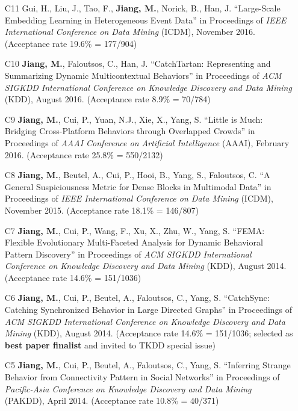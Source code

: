 \documentclass[10pt]{article}
\newenvironment{myindentpar}[1]%
{\begin{list}{}%
         {\setlength{\leftmargin}{#1}}%
         \item[]%
}
{\end{list}}
\newcounter{list}
\begin{document}
\begin{myindentpar}{0.00cm}
\begin{enumerate}[leftmargin=.5cm]
\item[C11] Gui, H., Liu, J., Tao, F., \textbf{Jiang, M.}, Norick, B., Han, J. ``Large-Scale Embedding Learning in Heterogeneous Event Data'' in Proceedings of \textit{IEEE International Conference on Data Mining} (ICDM), November 2016. (Acceptance rate 19.6\% = 177/904)

\item[C10] \textbf{Jiang, M.}, Faloutsos, C., Han, J. ``CatchTartan: Representing and Summarizing Dynamic Multicontextual Behaviors'' in Proceedings of \textit{ACM SIGKDD International Conference on Knowledge Discovery and Data Mining} (KDD), August 2016. (Acceptance rate 8.9\% = 70/784)

\item[C9] \textbf{Jiang, M.}, Cui, P., Yuan, N.J., Xie, X., Yang, S. ``Little is Much: Bridging Cross-Platform Behaviors through Overlapped Crowds'' in Proceedings of \textit{AAAI Conference on Artificial Intelligence} (AAAI), February 2016. (Acceptance rate 25.8\% = 550/2132)

\item[C8] \textbf{Jiang, M.}, Beutel, A., Cui, P., Hooi, B., Yang, S., Faloutsos, C. ``A General Suspiciousness Metric for Dense Blocks in Multimodal Data'' in Proceedings of \textit{IEEE International Conference on Data Mining} (ICDM), November 2015. (Acceptance rate 18.1\% = 146/807)

\item[C7] \textbf{Jiang, M.}, Cui, P., Wang, F., Xu, X., Zhu, W., Yang, S. ``FEMA: Flexible Evolutionary Multi-Faceted Analysis for Dynamic Behavioral Pattern Discovery'' in Proceedings of \textit{ACM SIGKDD International Conference on Knowledge Discovery and Data Mining} (KDD), August 2014. (Acceptance rate 14.6\% = 151/1036)

\item[C6] \textbf{Jiang, M.}, Cui, P., Beutel, A., Faloutsos, C., Yang, S. ``CatchSync: Catching Synchronized Behavior in Large Directed Graphs'' in Proceedings of \textit{ACM SIGKDD International Conference on Knowledge Discovery and Data Mining} (KDD), August 2014. (Acceptance rate 14.6\% = 151/1036; selected as \textbf{best paper finalist} and invited to TKDD special issue)
	
\item[C5] \textbf{Jiang, M.}, Cui, P., Beutel, A., Faloutsos, C., Yang, S. ``Inferring Strange Behavior from Connectivity Pattern in Social Networks'' in Proceedings of \textit{Pacific-Asia Conference on Knowledge Discovery and Data Mining} (PAKDD), April 2014. (Acceptance rate 10.8\% = 40/371)


\end{enumerate}
\end{myindentpar}
\end{document}
